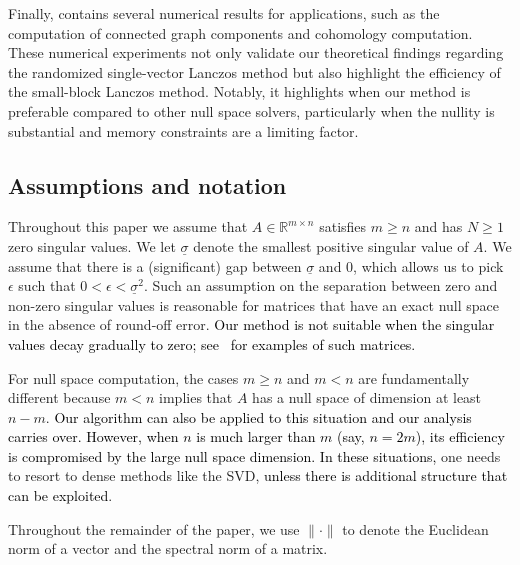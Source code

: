 \documentclass{siamart190516}
\newcommand{\R}{\mathbb{R}}
\providecommand{\norm}[1]{\lVert#1\rVert}
\newcommand{\edit}[1]{\textcolor{black}{#1}} %
\newcommand{\redit}[1]{\textcolor{black}{#1}} %
\begin{document}
    Finally,  contains several numerical results for applications, such as the computation of connected graph components and cohomology computation. These numerical experiments not only validate our theoretical findings regarding the randomized single-vector Lanczos method but also highlight the efficiency of the small-block Lanczos method. Notably, it highlights when our method is preferable compared to other null space solvers, particularly when the nullity is substantial and memory constraints are a limiting factor.
    
\subsection{Assumptions and notation}

Throughout this paper we assume that $A \in \R^{m\times n}$ satisfies $m\ge n$ and has $N\ge 1$ zero singular values.
We let $\underline{\sigma}$ denote the smallest positive singular value of $A$. We assume that there is a (significant) gap between $\underline{\sigma}$ and $0$, which allows us to pick $\epsilon$ such that $0 < \epsilon<\underline{\sigma}^{2}$. Such an assumption on the separation between zero and non-zero singular values is reasonable for matrices that have an exact null space in the absence of round-off error. \redit{Our method is not suitable when the singular values decay gradually to zero; see~\cite{Beckermann2019} for examples of such matrices.}
\begin{remark}
    For null space computation, the cases $m\geq n$ and $m<n$ are fundamentally different because $m<n$ implies that $A$ has a null space of dimension at least $n-m$. \edit{Our algorithm can also be applied to this situation and our analysis carries over. However, when $n$ is much larger than $m$ (say, $n=2m$), its efficiency is compromised by the large null space dimension. In these situations,}
    one needs to resort to dense methods like the SVD, \edit{unless there is additional structure that can be exploited}.
\end{remark}

Throughout the remainder of the paper, we use $\norm{\cdot}$ to denote the Euclidean norm of a vector and the spectral norm of a matrix.
\end{document}
